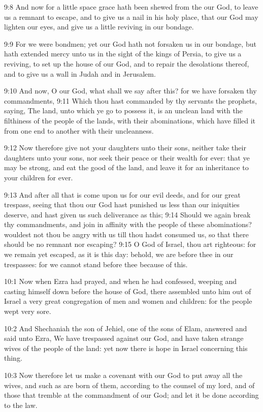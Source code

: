 9:8 And now for a little space grace hath been shewed from the \LORD
our God, to leave us a remnant to escape, and to give us a nail in his
holy place, that our God may lighten our eyes, and give us a little
reviving in our bondage.

9:9 For we were bondmen; yet our God hath not forsaken us in our
bondage, but hath extended mercy unto us in the sight of the kings of
Persia, to give us a reviving, to set up the house of our God, and to
repair the desolations thereof, and to give us a wall in Judah and in
Jerusalem.

9:10 And now, O our God, what shall we say after this? for we have
forsaken thy commandments, 9:11 Which thou hast commanded by thy
servants the prophets, saying, The land, unto which ye go to possess
it, is an unclean land with the filthiness of the people of the lands,
with their abominations, which have filled it from one end to another
with their uncleanness.

9:12 Now therefore give not your daughters unto their sons, neither
take their daughters unto your sons, nor seek their peace or their
wealth for ever: that ye may be strong, and eat the good of the land,
and leave it for an inheritance to your children for ever.

9:13 And after all that is come upon us for our evil deeds, and for
our great trespass, seeing that thou our God hast punished us less
than our iniquities deserve, and hast given us such deliverance as
this; 9:14 Should we again break thy commandments, and join in
affinity with the people of these abominations? wouldest not thou be
angry with us till thou hadst consumed us, so that there should be no
remnant nor escaping?  9:15 O \LORD God of Israel, thou art righteous:
for we remain yet escaped, as it is this day: behold, we are before
thee in our trespasses: for we cannot stand before thee because of
this.

10:1 Now when Ezra had prayed, and when he had confessed, weeping and
casting himself down before the house of God, there assembled unto him
out of Israel a very great congregation of men and women and children:
for the people wept very sore.

10:2 And Shechaniah the son of Jehiel, one of the sons of Elam,
answered and said unto Ezra, We have trespassed against our God, and
have taken strange wives of the people of the land: yet now there is
hope in Israel concerning this thing.

10:3 Now therefore let us make a covenant with our God to put away all
the wives, and such as are born of them, according to the counsel of
my lord, and of those that tremble at the commandment of our God; and
let it be done according to the law.

